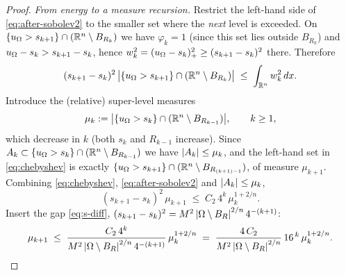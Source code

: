 \begin{proof}
\smallskip
\emph{From energy to a measure recursion.} Restrict the left-hand side of
\eqref{eq:after-sobolev2} to the smaller set where the \emph{next} level
is exceeded. On $\{u_\Omega>s_{k+1}\}\cap(\mathbb R^n\setminus B_{R_{k}})$ we have
$\varphi_k=1$ (since this set lies outside $B_{R_k}$) and
$u_\Omega-s_k>s_{k+1}-s_k$, hence
$w_k^2=(u_\Omega-s_k)_+^2\ge(s_{k+1}-s_k)^2$ there. Therefore
\begin{equation}\label{eq:chebyshev}
   (s_{k+1}-s_k)^2\,
   \bigl|\{u_\Omega>s_{k+1}\}\cap(\mathbb R^n\setminus B_{R_{k}})\bigr|
   \;\le\;\int_{\mathbb R^n}w_k^2\,dx .
\end{equation}
Introduce the (relative) super-level measures
\[
   \mu_k:=\bigl|\{u_\Omega>s_k\}\cap(\mathbb R^n\setminus B_{R_{k-1}})\bigr|,
   \qquad k\ge1,
\]
which decrease in $k$ (both $s_k$ and $R_{k-1}$ increase). Since
$A_k\subset\{u_\Omega>s_k\}\cap(\mathbb R^n\setminus B_{R_{k-1}})$ we have
$\left|A_k\right|\le\mu_k$, and the left-hand set in \eqref{eq:chebyshev} is
exactly $\{u_\Omega>s_{k+1}\}\cap(\mathbb R^n\setminus B_{R_{(k+1)-1}})$, of
measure $\mu_{k+1}$.
Combining \eqref{eq:chebyshev},
\eqref{eq:after-sobolev2} and $\left|A_k\right|\le\mu_k$,
\[
   (s_{k+1}-s_k)^2\,\mu_{k+1}
   \;\le\;C_2\,4^{k}\,\mu_k^{1+2/n}.
\]
Insert the gap \eqref{eq:s-diff},
$(s_{k+1}-s_k)^2=M^2\left|\Omega\setminus B_R\right|^{2/n}4^{-(k+1)}$:
\begin{equation}\label{eq:mu-recursion}
   \mu_{k+1}\;\le\;
   \frac{C_2\,4^{k}}{M^2\left|\Omega\setminus B_R\right|^{2/n}4^{-(k+1)}}\,
   \mu_k^{1+2/n}
   \;=\;\frac{4\,C_2}{M^2\left|\Omega\setminus B_R\right|^{2/n}}\,16^{\,k}\,
   \mu_k^{1+2/n}.
\end{equation}


\end{proof}
